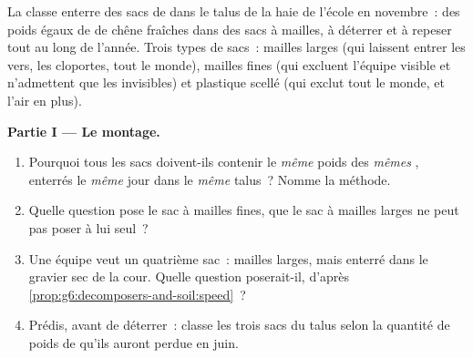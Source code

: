 \begin{problem}\label{pb:g6:decomposers-and-soil:1}
La classe enterre des sacs de  dans le talus de la haie de
l'école en novembre~: des poids égaux de  de chêne fraîches
dans des sacs à mailles, à déterrer et à repeser tout au long de
l'année. Trois types de sacs~: mailles larges (qui laissent entrer
les vers, les cloportes, tout le monde), mailles fines (qui excluent
l'équipe visible et n'admettent que les invisibles) et plastique
scellé (qui exclut tout le monde, et l'air en plus).

\medskip\noindent\textbf{Partie I --- Le montage.}
\begin{enumerate}
  \item Pourquoi tous les sacs doivent-ils contenir le \emph{même}
        poids des \emph{mêmes} , enterrés le \emph{même}
        jour dans le \emph{même} talus~? Nomme la méthode.
  \item Quelle question pose le sac à mailles fines, que le sac à
        mailles larges ne peut pas poser à lui seul~?
  \item Une équipe veut un quatrième sac~: mailles larges, mais
        enterré dans le gravier sec de la cour. Quelle question
        poserait-il, d'après
        \cref{prop:g6:decomposers-and-soil:speed}~?
  \item Prédis, avant de déterrer~: classe les trois sacs du talus
        selon la quantité de poids de  qu'ils auront perdue
        en juin.
\end{enumerate}


\end{problem}
